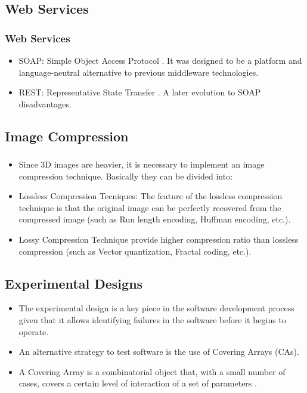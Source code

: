 \documentclass[compress]{beamer}
\begin{document}
\subsection{Web Services}
\begin{frame}
	\frametitle{Web Services}
	\begin{itemize}
	\item SOAP: Simple Object Access Protocol \cite{Pautasso:2007}. It was designed to be a platform and language-neutral alternative to previous middleware technologies.
	\item REST: Representative State Transfer \cite{Fielding00Phd}. A later evolution to SOAP disadvantages.
	\end{itemize}
\end{frame}

\subsection{Image Compression}
\begin{frame}
	\frametitle{}
	\begin{itemize}
	\item Since 3D images are heavier, it is necessary to implement an image compression technique. Basically they can be divided into:
	\item Lossless Compression Tecniques: The feature of the lossless compression technique is that the original image can be perfectly recovered from the compressed image \cite{Woods:2008} (such as Run length encoding, Huffman encoding, etc.).
	\item Lossy Compression Technique provide higher compression ratio than lossless compression (such as Vector quantization, Fractal coding, etc.).
	\end{itemize}
\end{frame}

\subsection{Experimental Designs}
\begin{frame}
	\begin{itemize}
	\item The experimental design is a key piece in the software development process given that it allows identifying failures in the software before it begins to operate.
	\item An alternative strategy to test software is the use of Covering Arrays (CAs).
	\item A Covering Array is a combinatorial object that, with a small number of cases, covers a certain level of interaction of a set of parameters \cite{Kuhn:2008}.
	\end{itemize}
\end{frame}
\end{document}
